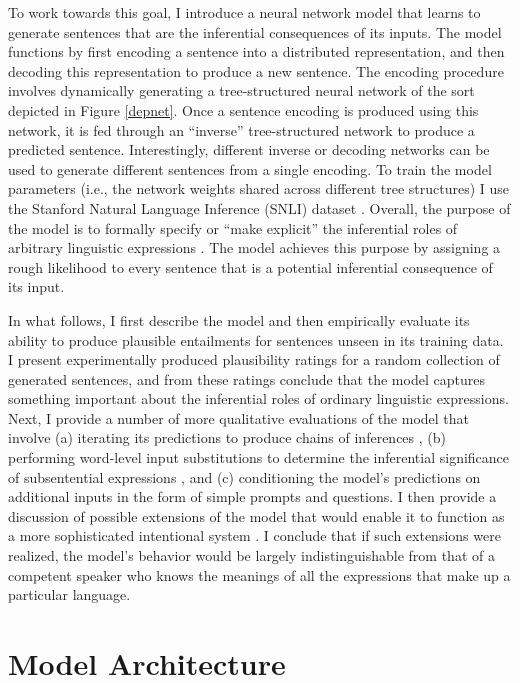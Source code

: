 To work towards this goal, I introduce a neural network model that learns to generate sentences that are the inferential consequences of its inputs. The model functions by first encoding a sentence into a distributed representation, and then decoding this representation to produce a new sentence. The encoding procedure involves dynamically generating a tree-structured neural network of the sort depicted in Figure \ref{depnet}. Once a sentence encoding is produced using this network, it is fed through an ``inverse'' tree-structured network to produce a predicted sentence. Interestingly, different inverse or decoding networks can be used to generate different sentences from a single encoding. To train the model parameters (i.e., the network weights shared across different tree structures) I use the Stanford Natural Language Inference (SNLI) dataset \citep{Bowman:2015}. Overall, the purpose of the model is to formally specify or ``make explicit'' the inferential roles of arbitrary linguistic expressions \citep{Brandom:1994}. The model achieves this purpose by assigning a rough likelihood to every sentence that is a potential inferential consequence of its input. 

In what follows, I first describe the model and then empirically evaluate its ability to produce plausible entailments for sentences unseen in its training data. I present experimentally produced plausibility ratings for a random collection of generated sentences, and from these ratings conclude that the model captures something important about the inferential roles of ordinary linguistic expressions. Next, I provide a number of more qualitative evaluations of the model that involve (a) iterating its predictions to produce chains of inferences \citep{Kolesnyk:2016}, (b) performing word-level input substitutions to determine the inferential significance of subsentential expressions \citep{Brandom:2000,Brandom:1994}, and (c) conditioning the model's predictions on additional inputs in the form of simple prompts and questions. I then provide a discussion of possible extensions of the model that would enable it to function as a more sophisticated intentional system \citep{Dennett:1991,Dennett:1987}. I conclude that if such extensions were realized, the model's behavior would be largely indistinguishable from that of a competent speaker who knows the meanings of all the expressions that make up a particular language.

\section{Model Architecture}

